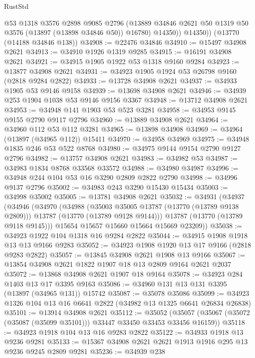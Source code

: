 \begin{lexlean}{RustStd}
\begin{coremodule}
            @53
            @1318
            @3576
            @2898
            @9085
            @2796
            (@13889 @34846 @2621 @50 @1319 @50 @3576 (@13897 (@13898 @34846 @50)) @16780)
            @14350))
        @14350))
    (@13770 (@14188 @34846 @138))
@34908 := @22476 @34846
@34910 := @15497 @34908 @2621
@34913 := @34910 @1926 @1319 @9285
@34915 := @16191 @34908 @2621
@34921 := @34915 @1905 @1922 @53 @1318 @9160 @9284
@34923 := @13877 @34908 @2621
@34931 := @34923 @1905 @1924 @53 @26798 @9160 (@2818 @9284 @2822)
@34933 := @13728 @34908 @2621
@34937 := @34933 @1905 @53 @9146 @9158
@34939 := @13698 @34908 @2621
@34946 := @34939 @253 @1904 @1038 @53 @9146 @9156 @3367
@34948 := @13712 @34908 @2621
@34953 := @34948 @141 @1903 @53 @523 @3281
@34958 := @34953 @9145 @9155 @2790 @9117 @2796
@34960 := @13889 @34908 @2621
@34964 := @34960 @112 @53 @112 @3281
@34965 := @13898 @34908
@34969 := @34964 (@13897 (@34965 @112)) @15411
@34970 := @34958 @34969
@34975 := @34948 @1835 @246 @53 @522 @8768
@34980 := @34975 @9144 @9154 @2790 @9127 @2796
@34982 := @13757 @34908 @2621
@34983 := @34982 @53
@34987 := @34983 @1834 @8768 @33568 @33572
@34988 := @34980 @34987
@34996 := @34948 @244 @104 @53 @16 @3290 @2809 @2822 @2790
@34998 := @34996 @9137 @2796
@35002 := @34983 @243 @3290 @15430 @15434
@35003 := @34998 @35002
@35005 := @13781 @34908 @2621
@35032 := @34931
    (@34937
      (@34946
        (@34970
          (@34988
            (@35003 @35005 @13787 (@13770 (@13789 @9138 @2809)))
            @13787
            (@13770 (@13789 @9128 @9144)))
          @13787
          (@13770 (@13789 @9118 @9145)))
        @15654
        @15657
        @15660
        @15664
        @15669
        @23209))
@35038 := @34923 @1922 @104 @1318 @16 @9284 @2822
@35044 := @34915 @1908 @1918 @13 @13 @9166 @9283
@35052 := @34923 @1908 @1920 @13 @17 @9166 (@2818 @9283 @2822)
@35057 := @13845 @34908 @2621 @1908 @13 @9166
@35067 := @13854 @34908 @2621 @1822 @1907 @18 @13 @2809 @9164 @2621 @2037
@35072 := @13868 @34908 @2621 @1907 @18 @9164
@35078 := @34923 @284 @1403 @13 @17 @3395 @9163
@35086 := @34960 @131 @13 @131 @3395 (@13897 (@34965 @131)) @15742
@35087 := @35078 @35086
@35099 := @34923 @1326 @104 @13 @16 @6641 @2822 (@34982 @13 @1325 @6641 @26834 @26838)
@35101 := @13914 @34908 @2621
@35112 := @35052
    (@35057 (@35067 (@35072 (@35087 (@35099 @35101))) @33447 @33450 @33453 @33456 @16159))
@35118 := @34923 @1918 @104 @13 @16 @9283 @2822
@35122 := @34933 @1918 @13 @9236 @9281
@35133 := @15367 @34908 @2621 @2621 @1913 @1916 @295 @13 @9236 @9245 @2809 @9281
@35236 := @34939
    @238

\end{coremodule}
\end{lexlean}
